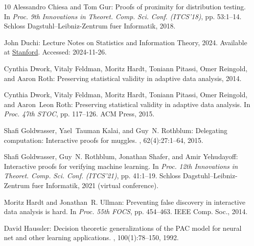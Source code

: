 \documentclass[11pt]{article}
\begin{document}
\begin{thebibliography}{10}
{\sc Alessandro Chiesa and Tom Gur}: Proofs of proximity for distribution
  testing.
\newblock In {\em Proc. 9th Innovations in Theoret. Comp. Sci. Conf.
  (ITCS'18)}, pp. 53:1--14. Schloss Dagstuhl--Leibniz-Zentrum fuer Informatik,
  2018.

{\sc John Duchi}: Lecture {N}otes on {S}tatistics and {I}nformation {T}heory,
  2024.
\newblock Available at
  \href{https://web.stanford.edu/class/stats311/lecture-notes.pdf}{Stanford}.
  Accessed: 2024-11-26.

{\sc Cynthia Dwork, Vitaly Feldman, Moritz Hardt, Toniann Pitassi, Omer
  Reingold, and Aaron Roth}: Preserving statistical validity in adaptive data
  analysis, 2014.

{\sc Cynthia Dwork, Vitaly Feldman, Moritz Hardt, Toniann Pitassi, Omer
  Reingold, and Aaron~Leon Roth}: Preserving statistical validity in adaptive
  data analysis.
\newblock In {\em Proc. 47th STOC}, pp. 117--126. ACM Press, 2015.
\newblock [\epfmtdoi{10.1145/2746539.2746580}]

{\sc Shafi Goldwasser, Yael~Tauman Kalai, and Guy~N. Rothblum}: Delegating
  computation: {I}nteractive proofs for muggles.
, 62(4):27:1--64, 2015.
\newblock [\epfmtdoi{10.1145/2699436}]

{\sc Shafi Goldwasser, Guy~N. Rothblum, Jonathan Shafer, and Amir Yehudayoff}:
  Interactive proofs for verifying machine learning.
\newblock In {\em Proc. 12th Innovations in Theoret. Comp. Sci. Conf.
  (ITCS'21)}, pp. 41:1--19. Schloss Dagstuhl--Leibniz-Zentrum fuer Informatik,
  2021 (virtual conference).

{\sc Moritz Hardt and Jonathan~R. Ullman}: Preventing false discovery in
  interactive data analysis is hard.
\newblock In {\em Proc. 55th FOCS}, pp. 454--463. IEEE Comp. Soc., 2014.

{\sc David Haussler}: Decision theoretic generalizations of the {PAC} model for
  neural net and other learning applications.
, 100(1):78--150, 1992.
\newblock [\epfmtdoi{10.1016/0890-5401(92)90010-D}]


\end{thebibliography}
\end{document}

